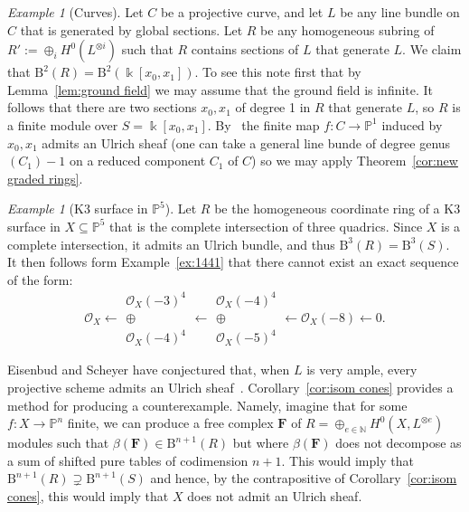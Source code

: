 \documentclass[12pt]{amsart}
\theoremstyle{definition}
\theoremstyle{remark}
\newtheorem{example}[lemma]{Example}
\newtheorem{remark}[lemma]{Remark}
\newcommand{\kk}{\Bbbk}
\newcommand{\PP}{\mathbb{P}}
\newcommand{\NN}{\mathbb{N}}
\newcommand{\cO}{\mathcal{O}}
\newcommand{\FF}{\mathbf{F}}
\newcommand{\BBQ}{\mathrm{B}}
\begin{document}
\begin{example}[Curves] Let $C$ be a projective curve, and let $L$ be any line bundle on $C$ that is generated by global sections.
Let $R$ be any homogeneous subring of $R' := \oplus_{i}H^{0}(L^{\otimes i})$ such that $R$ 
contains sections of $L$ that generate $L$. We claim that $\BBQ^2(R)=\BBQ^2(\kk[x_0,x_1])$. To see this note first
that by Lemma~\ref{lem:ground field} we may assume that the ground field is infinite. It follows that there are
two sections $x_{0},x_{1}$ of degree 1 in $R$ that generate $L$, so $R$ is a finite module over $S = \kk[x_{0},x_{1}].$
By~\cite[Corollary~4.5]{eis-schrey-chow} the finite map $f: C\to \PP^{1}$ induced by $x_{0}, x_{1}$ admits
an Ulrich sheaf (one can take a general line bunde of degree genus$(C_{1})-1$ on a reduced component $C_{1}$ of $C$)
so we may apply Theorem~\ref{cor:new graded rings}.
\end{example}


\begin{example}[K3 surface in $\PP^5$]
Let $R$ be the homogeneous coordinate ring of a K3 surface in $X\subseteq \PP^5$ that is the complete intersection of three quadrics. 
Since $X$ is a complete intersection, it admits an Ulrich bundle, and thus $\BBQ^3(R)=\BBQ^3(S)$.  It then follows form Example~\ref{ex:1441} that there cannot exist an exact sequence of the form:
\[
\cO_X\longleftarrow \begin{matrix}  \cO_X(-3)^4\\ \oplus\\ \cO_X(-4)^4\end{matrix}\longleftarrow \begin{matrix} \cO_X(-4)^4\\ \oplus\\ \cO_X(-5)^4\end{matrix} \longleftarrow \cO_X(-8)\longleftarrow 0.
\]
\end{example}



Eisenbud and Scheyer have conjectured that, when $L$ is very ample, every projective scheme admits an Ulrich sheaf~\cite[p. 543]{eis-schrey-chow}.  Corollary~\ref{cor:isom cones} provides a method for producing a counterexample.  Namely, imagine that for some $f\colon X\to \PP^n$ finite, we can produce a free complex $\FF$ of $R=\oplus_{e\in \NN} H^0(X,L^{\otimes e})$ modules such that $\beta(\FF)\in \BBQ^{n+1}(R)$ but where $\beta(\FF)$ does not decompose as a sum of shifted pure tables of codimension $n+1$.  This would imply that $\BBQ^{n+1}(R)\supsetneq \BBQ^{n+1}(S)$ and hence, by the contrapositive of Corollary~\ref{cor:isom cones}, this would imply that $X$ does not admit an Ulrich sheaf.
\end{document}
